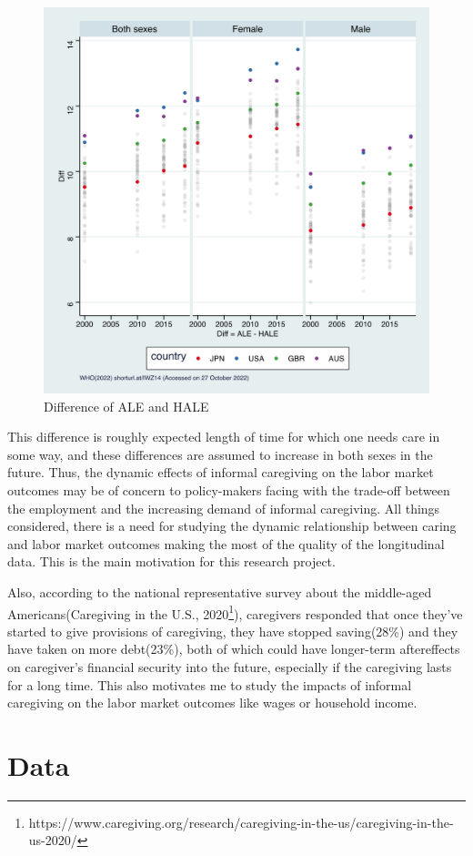 \documentclass{article}
\theoremstyle{definition}
\begin{document}
\begin{figure}[h]
    \centering
    \includegraphics[width=0.5\columnwidth]{WHO_diff_expectancy.png}
    \caption{Difference of ALE and HALE}
\end{figure}

This difference is roughly expected length of time for which one needs care in some way, and these differences are assumed to increase in both sexes in the future. Thus, the dynamic effects of informal caregiving on the labor market outcomes may be of concern to policy-makers facing with the trade-off between the employment and the increasing demand of informal caregiving. All things considered, there is a need for studying the dynamic relationship between caring and labor market outcomes making the most of the quality of the longitudinal data. This is the main motivation for this research project.

Also, according to the national representative survey about the middle-aged Americans(Caregiving in the U.S., 2020\footnote[1]{https://www.caregiving.org/research/caregiving-in-the-us/caregiving-in-the-us-2020/}), caregivers responded that once they've started to give provisions of caregiving, they have stopped saving(28\%) and they have taken on more debt(23\%), both of which could have longer-term aftereffects on caregiver's financial security into the future, especially if the caregiving lasts for a long time. This also motivates me to study the impacts of informal caregiving on the labor market outcomes like wages or household income.

\section{Data}
\end{document}
